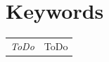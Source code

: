\section*{Keywords}
\begin{tabularx}{\textwidth}{ l X }
    \textit{ToDo} & ToDo \\ 
\end{tabularx}
